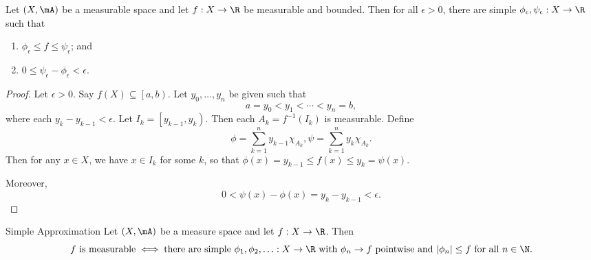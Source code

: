 \documentclass[pmath451]{subfiles}
\begin{document}
    \begin{prop}{}
        Let $\left( X,\mA \right)$ be a measurable space and let $f:X\to\R$ be measurable and bounded. Then for all $\epsilon>0$, there are simple $\phi_{\epsilon},\psi_{\epsilon}:X\to\R$ such that
        \begin{enumerate}
            \item $\phi_{\epsilon}\leq f\leq\psi_{\epsilon}$; and
            \item $0\leq\psi_{\epsilon}-\phi_{\epsilon}<\epsilon$.
        \end{enumerate}
    \end{prop}
    
    \begin{proof}
        Let $\epsilon>0$. Say $f\left( X \right)\subseteq\left[ a,b \right)$. Let $y_0,\ldots,y_n$ be given such that
        \begin{equation*}
            a = y_0 < y_1 < \cdots < y_n = b,
        \end{equation*}
        where each $y_k-y_{k-1}<\epsilon$. Let $I_k = \left[ y_{k-1},y_k \right)$. Then each $A_k = f^{-1}\left( I_k \right)$ is measurable. Define
        \begin{equation*}
            \phi = \sum^{n}_{k=1} y_{k-1}\chi_{A_k}, \psi = \sum^{n}_{k=1}y_k\chi_{A_k}.
        \end{equation*}
        Then for any $x\in X$, we have $x\in I_k$ for some $k$, so that $\phi\left( x \right) = y_{k-1} \leq f\left( x \right) \leq y_k = \psi\left( x \right)$.

        Moreover,
        \begin{equation*}
            0 < \psi\left( x \right) - \phi\left( x \right) = y_k-y_{k-1} < \epsilon.
        \end{equation*}
    \end{proof}

    \begin{theorem}{Simple Approximation}
        Let $\left( X,\mA \right)$ be a measure space and let $f:X\to\R$. Then
        \begin{equation*}
            \text{$f$ is measurable} \iff \text{there are simple $\phi_1,\phi_2,\ldots:X\to\R$ with $\phi_n\to f$ pointwise and $\left| \phi_n \right|\leq f$ for all $n\in\N$}.
        \end{equation*}
    \end{theorem}
    
\end{document}
